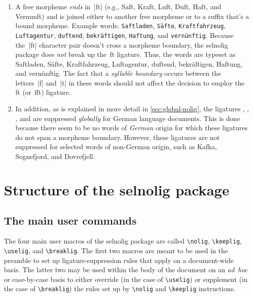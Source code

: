\documentclass[11pt]{article}
\newcommand{\pkg}[1]{\textsf{#1}}
\newcommand{\opt}[1]{\texttt{#1}}
\newcommand{\cmmd}[1]{\texttt{\textbackslash #1}}
\begin{document}
\begin{enumerate}
\item A free morpheme \emph{ends} in~|ft| (e.g., Saft, Kraft, Luft, Duft, Haft, and Vernunft) and is joined either to another free morpheme or to a suffix that's a bound morpheme. Example words: 
\opt{Saftladen}, 
\opt{Säfte},  
\opt{Kraftfahrzeug}, 
\opt{Luftagentur}, 
\opt{duftend}, 
\opt{bekräftigen}, 
\opt{Haftung}, and 
\opt{vernünftig}. 
Because the~|ft| character pair doesn't cross a morpheme boundary, the \pkg{selnolig} package does \emph{not} break up the~ft ligature. Thus, the words are typeset as 
Saftladen, 
Säfte,
Kraftfahrzeug, 
Luftagentur, 
duftend, 
bekräftigen, 
Haftung, and 
vernünftig. 
The fact that a \emph{syllable boundary} occurs between the letters~|f| and~|t| in these words should not affect the decision to employ the ft (or~fft) ligature.

\item
In addition, as is explained in more detail in \cref{sec:global-nolig}, the ligatures {\ebg {}, , }, and {\ebg{}} are suppressed \emph{globally} for German language documents. This is done because there seem to be no words of \emph{German} origin for which these ligatures do not span a morpheme boundary. However, these ligatures are not suppressed for selected words of non-German origin, such as {\ebg Kafka, Sognefjord, and Dovrefjell}. 
\end{enumerate}



\section[Structure of the selnolig package]{Structure of the \pkg{selnolig} package} \label{sec:structure}

\subsection{The main user commands} \label{sec:syntax}

The four main user macros of the \pkg{selnolig} package are called \cmmd{nolig}, \cmmd{keeplig}, \cmmd{uselig}, and \cmmd{breaklig}. The first two macros are meant to be used in the preamble to set up ligature-suppression rules that apply on a document-wide basis. The latter two may be used within the body of the document on an \emph{ad~hoc} or case-by-case basis to either override (in the case of \cmmd{uselig}) or supplement (in the case of \cmmd{breaklig}) the rules set up by \cmmd{nolig} and \cmmd{keeplig} instructions.
\end{document}
